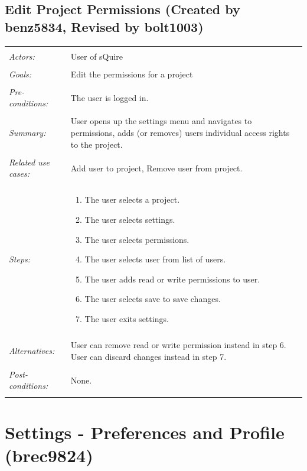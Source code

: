 \documentclass[11pt]{report}
\begin{document}
\subsection{Edit Project Permissions (Created by benz5834, Revised by bolt1003)}
\begin{tabular}{ p{2cm} p{12cm} }
 \hline
 \\
 \textit{Actors:} & User of sQuire \\ 
 \\
 \textit{Goals:} & Edit the permissions for a project \\
 \\
 \textit{Pre-conditions:} & The user is logged in. \\
 \\
 \textit{Summary:} & User opens up the settings menu and navigates to permissions, adds (or removes) users individual access rights to the project.  \\ 
 \\
 \textit{Related use cases:} & Add user to project, Remove user from project. \\ 
 \\
 \textit{Steps:} & \begin{enumerate}
  \item The user selects a project.
  \item The user selects settings.
  \item The user selects permissions.
  \item The user selects user from list of users.
  \item The user adds read or write permissions to user.
  \item The user selects save to save changes.
  \item The user exits settings.
 \end{enumerate} \\
 \\
 \textit{Alternatives:} & User can remove read or write permission instead in step 6. User can discard changes instead in step 7. \\
 \\
 \textit{Post-conditions:} & None. \\
 \\
\hline
\end{tabular}


\section{Settings - Preferences and Profile (brec9824)}
\end{document}
